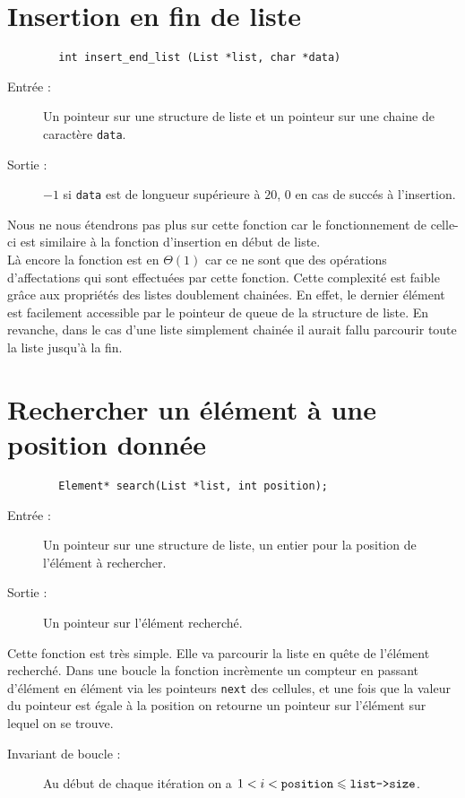 \documentclass[a4paper, 12pt, leqno]{report}
\theoremstyle{plain}
\begin{document}
            
        \section{Insertion en fin de liste}
           \begin{verbatim}
        int insert_end_list (List *list, char *data)
           \end{verbatim}
            \begin{description}
            \item[Entrée :] Un pointeur sur une structure de liste et un pointeur sur une chaine de caractère \verb+data+.
            \item[Sortie :] $-1$ si \verb+data+ est de longueur supérieure à $20$, $0$ en cas de succés à l'insertion.
            \end{description}
            Nous ne nous étendrons pas plus sur cette fonction car le fonctionnement de celle-ci est similaire à la fonction d'insertion en début de liste.\\
            
            Là encore la fonction est en $\Theta(1)$ car ce ne sont que des opérations d'affectations qui sont effectuées par cette fonction. Cette complexité est faible grâce aux propriétés des listes doublement chainées. En effet, le dernier élément est facilement accessible par le pointeur de queue de la structure de liste. En revanche, dans le cas d'une liste simplement chainée il aurait fallu parcourir toute la liste jusqu'à la fin.

        \newpage
        
        \section{Rechercher un élément à une position donnée}
           \label{search}
           \begin{verbatim}
        Element* search(List *list, int position);
           \end{verbatim}
            \begin{description}
            \item[Entrée :] Un pointeur sur une structure de liste, un entier pour la position de l'élément à rechercher.
            \item[Sortie :] Un pointeur sur l'élément recherché.
            \end{description}        

            Cette fonction est très simple. Elle va parcourir la liste en quête de l'élément recherché. Dans une boucle la fonction incrèmente un compteur en passant d'élément en élément via les pointeurs \verb+next+ des cellules, et une fois que la valeur du pointeur est égale à la position on retourne un pointeur sur l'élément sur lequel on se trouve.
            \begin{description}
            \item[Invariant de boucle :] Au début de chaque itération on a $1<i<\verb+position+ \leqslant \verb+list->size+$.
            \end{description}
            
\end{document}
